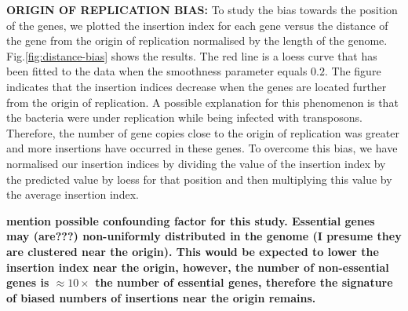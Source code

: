 \documentclass[12pt,letterpaper]{article}
\begin{document}
{\bf ORIGIN OF REPLICATION BIAS:} To study the bias towards the position of the genes, we plotted the insertion index for each gene versus the distance of the gene from the origin of replication normalised by the length of the genome. Fig.\@ \ref{fig:distance-bias} shows the results. The red line is a loess curve that has been fitted to the data when the smoothness parameter equals $0.2$. The figure indicates that the insertion indices decrease when the genes are located further from the origin of replication. A possible explanation for this phenomenon is that the bacteria were under replication while being infected with transposons. Therefore, the number of gene copies close to the origin of replication was greater and more insertions have occurred in these genes. To overcome this bias, we have normalised our insertion indices by dividing the value of the insertion index by the predicted value by loess for that position and then multiplying this value by the average insertion index.

{\bf mention possible confounding factor for this study. Essential genes may (are???) non-uniformly distributed in the genome (I presume they are clustered near the origin). This would be expected to lower the insertion index near the origin, however, the number of non-essential genes is $\approx 10\times$ the number of essential genes, therefore the signature of biased numbers of insertions near the origin remains. }
\end{document}
